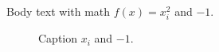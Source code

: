 \documentclass{article}
\begin{document}
Body text with math $f(x) = x_{i}^{2}$ and $-1$.

\begin{figure}[htbp]
  \centering
  \caption{Caption $x_{i}$ and $-1$.}
\end{figure}
\end{document}
